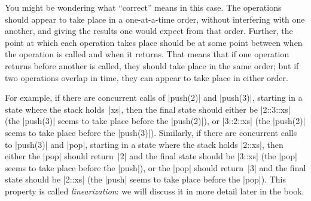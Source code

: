 \begin{questionS}
You might be wondering what ``correct'' means in this case.  The operations
should appear to take place in a one-at-a-time order, without interfering with
one another, and giving the results one would expect from that order.
Further, the point at which each operation takes place should be at some point
between when the operation is called and when it returns.  That means that if
one operation returns before another is called, they should take place in the
same order; but if two operations overlap in time, they can appear to take
place in either order.

For example, if there are concurrent calls of |push(2)| and |push(3)|,
starting in a state where the stack holds~|xs|, then the final state should
either be |2::3::xs| (the |push(3)| seems to take place before the
|push(2)|), or |3::2::xs| (the |push(2)| seems to take place before the
|push(3)|).  Similarly, if there are concurrent calls to |push(3)| and |pop|,
starting in a state where the stack holds |2::xs|, then either the |pop|
should return~|2| and the final state should be |3::xs| (the |pop| seems to
take place before the |push|), or the |pop| should return~|3| and the final
state should be |2::xs| (the |push| seems to take place before the |pop|).
This property is called \emph{linearization}: we will discuss it in more
detail later in the book.
\end{questionS}


